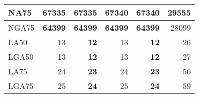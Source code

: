 \documentclass[12pt,a4paper]{article}
\begin{document}
\begin{table}[ht]
\begin{center}
\begin{tabular}{|l*{5}{|r}|}
NA75 & 67335 & 67335 & {\bf 67340} & {\bf 67340} & 29555 \\ \hline
NGA75 & {\bf 64399} & {\bf 64399} & {\bf 64399} & {\bf 64399} & 28099 \\ \hline
LA50 & 13 & {\bf 12} & 13 & {\bf 12} & 26 \\ \hline
LGA50 & 13 & {\bf 12} & 13 & {\bf 12} & 27 \\ \hline
LA75 & 24 & {\bf 23} & 24 & {\bf 23} & 56 \\ \hline
LGA75 & 25 & {\bf 24} & 25 & {\bf 24} & 59 \\ \hline
\end{tabular}
\end{center}
\end{table}
\end{document}
